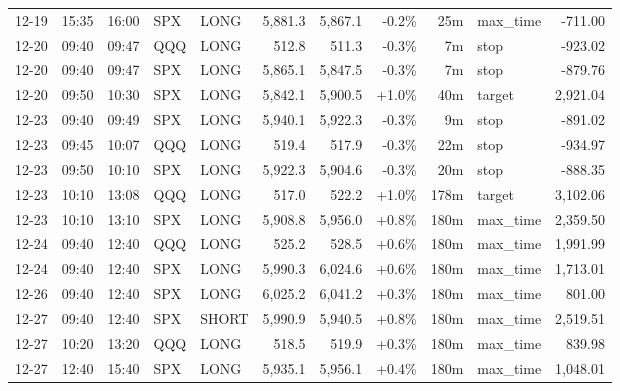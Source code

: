 \documentclass[11pt,a4paper,twoside]{article}
\begin{document}
\begin{center}
\begin{longtable}{>{\color{txtmain}}l l l l l r r r r >{\color{txtmain}}l r}
12-19 & 15:35 & 16:00 & SPX & LONG & 5,881.3 & 5,867.1 & \textcolor{lossred}{-0.2\%} & 25m & max\_time & \textcolor{lossred}{-711.00} \\
12-20 & 09:40 & 09:47 & QQQ & LONG & 512.8 & 511.3 & \textcolor{lossred}{-0.3\%} & 7m & stop & \textcolor{lossred}{-923.02} \\
12-20 & 09:40 & 09:47 & SPX & LONG & 5,865.1 & 5,847.5 & \textcolor{lossred}{-0.3\%} & 7m & stop & \textcolor{lossred}{-879.76} \\
12-20 & 09:50 & 10:30 & SPX & LONG & 5,842.1 & 5,900.5 & \textcolor{wingreen}{+1.0\%} & 40m & target & \textcolor{wingreen}{2,921.04} \\
12-23 & 09:40 & 09:49 & SPX & LONG & 5,940.1 & 5,922.3 & \textcolor{lossred}{-0.3\%} & 9m & stop & \textcolor{lossred}{-891.02} \\
12-23 & 09:45 & 10:07 & QQQ & LONG & 519.4 & 517.9 & \textcolor{lossred}{-0.3\%} & 22m & stop & \textcolor{lossred}{-934.97} \\
12-23 & 09:50 & 10:10 & SPX & LONG & 5,922.3 & 5,904.6 & \textcolor{lossred}{-0.3\%} & 20m & stop & \textcolor{lossred}{-888.35} \\
12-23 & 10:10 & 13:08 & QQQ & LONG & 517.0 & 522.2 & \textcolor{wingreen}{+1.0\%} & 178m & target & \textcolor{wingreen}{3,102.06} \\
12-23 & 10:10 & 13:10 & SPX & LONG & 5,908.8 & 5,956.0 & \textcolor{wingreen}{+0.8\%} & 180m & max\_time & \textcolor{wingreen}{2,359.50} \\
12-24 & 09:40 & 12:40 & QQQ & LONG & 525.2 & 528.5 & \textcolor{wingreen}{+0.6\%} & 180m & max\_time & \textcolor{wingreen}{1,991.99} \\
12-24 & 09:40 & 12:40 & SPX & LONG & 5,990.3 & 6,024.6 & \textcolor{wingreen}{+0.6\%} & 180m & max\_time & \textcolor{wingreen}{1,713.01} \\
12-26 & 09:40 & 12:40 & SPX & LONG & 6,025.2 & 6,041.2 & \textcolor{wingreen}{+0.3\%} & 180m & max\_time & \textcolor{wingreen}{801.00} \\
12-27 & 09:40 & 12:40 & SPX & SHORT & 5,990.9 & 5,940.5 & \textcolor{wingreen}{+0.8\%} & 180m & max\_time & \textcolor{wingreen}{2,519.51} \\
12-27 & 10:20 & 13:20 & QQQ & LONG & 518.5 & 519.9 & \textcolor{wingreen}{+0.3\%} & 180m & max\_time & \textcolor{wingreen}{839.98} \\
12-27 & 12:40 & 15:40 & SPX & LONG & 5,935.1 & 5,956.1 & \textcolor{wingreen}{+0.4\%} & 180m & max\_time & \textcolor{wingreen}{1,048.01} \\

\end{longtable}
\end{center}
\end{document}
